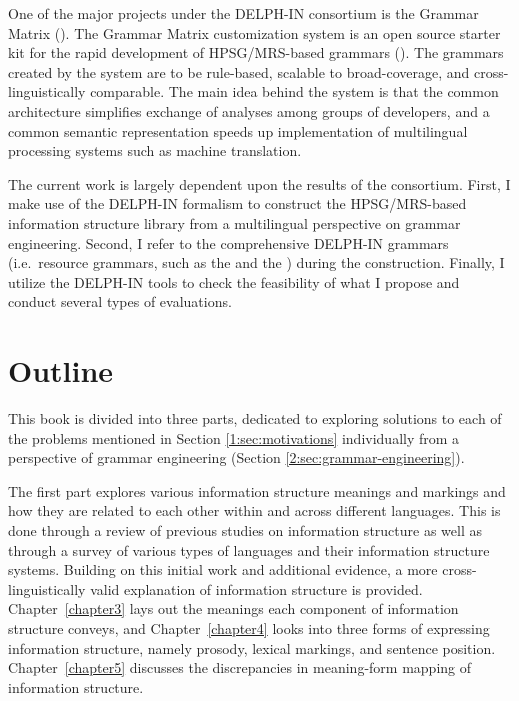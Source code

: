 One of the major projects under the DELPH-IN consortium is the \lingo
Grammar Matrix (\citealt{bender:etal:10}).  The \lingo Grammar Matrix
customization system is an open source starter kit for the rapid
development of HPSG/MRS-based grammars
().  The grammars
created by the system are to be rule-based, scalable to
broad-coverage, and cross-linguistically comparable. The main idea
behind the system is that the common architecture simplifies exchange
of analyses among groups of developers, and a common semantic
representation speeds up implementation of multilingual processing
systems such as machine translation.



The current work is largely dependent upon the results of the
 consortium.  First, I make use of the DELPH-IN
formalism to construct the HPSG/MRS-based information structure
library from a multilingual perspective on grammar
engineering. Second, I refer to the comprehensive DELPH-IN grammars
(i.e.\ resource grammars, such as the  and the )
during the construction. Finally, I utilize the DELPH-IN tools to
check the feasibility of what I propose and conduct several types of
evaluations.





\section{Outline}
\label{1:sec:outlines}

This book is divided into three parts, dedicated to exploring
solutions to each of the problems mentioned in Section \ref{1:sec:motivations}
individually from a perspective of grammar engineering
(Section \ref{2:sec:grammar-engineering}).


The first part explores various information structure meanings and
markings and how they are related to each other within and across
different languages.  This is done through a review of previous
studies on information structure as well as through a survey of
various types of languages and their information structure
systems. Building on this initial work and additional evidence, a more
cross-linguistically valid explanation of information structure is
provided. Chapter~\ref{chapter3} lays out the meanings each component
of information structure conveys, and Chapter~\ref{chapter4} looks
into three forms of expressing information structure, namely prosody,
lexical markings, and sentence position.  Chapter~\ref{chapter5}
discusses the discrepancies in meaning-form mapping of information
structure.





